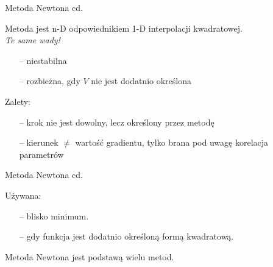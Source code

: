   \begin{frame}{Metoda Newtona cd.}

    \begin{block}{}
    Metoda jest n-D odpowiednikiem 1-D interpolacji kwadratowej.
      \smallskip
	  \\ \emph{Te same wady!}
	  \begin{itemize}
	  	\item[--] niestabilna
	  	\item[--] rozbieżna, gdy $V$ nie jest dodatnio określona
	  \end{itemize}
	\end{block}
    \begin{block}{Zalety:}
      \begin{itemize}
	  	\item[--] krok nie jest dowolny, lecz określony przez metodę
	  	\item[--] kierunek $\neq$ wartość gradientu, tylko brana pod uwagę korelacja parametrów
	  \end{itemize}
	\end{block}

  \end{frame}

  \begin{frame}{Metoda Newtona cd.}

	\begin{block}{Używana:}
      \begin{itemize}
	  	\item[--] blisko minimum.
	  	\item[--] gdy funkcja jest dodatnio określoną formą kwadratową.
	  \end{itemize}
	\end{block}
	\begin{block}{}
	    Metoda Newtona jest podstawą wielu metod.
	\end{block}

  \end{frame}

